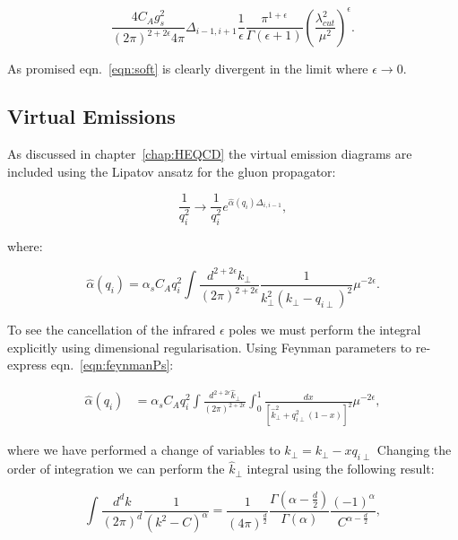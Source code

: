 			\begin{equation}
				\frac{4C_Ag_s^2}{(2\pi)^{2+2\epsilon}4\pi}\Delta_{i-1, i+1}
				\frac{1}{\epsilon}\frac{\pi^{1+\epsilon}}
				{\Gamma(\epsilon+1)}\left(\frac{\lambda_{cut}^2}{\mu^2}\right)^\epsilon.
				\label{eqn:soft}
			\end{equation}

			As promised eqn.~\eqref{eqn:soft} is clearly divergent in the limit where $\epsilon\to0$.

	\subsection{Virtual Emissions}
		\label{sub:subsection_name}

		As discussed in chapter~\ref{chap:HEQCD} the virtual emission diagrams are included
		using the Lipatov ansatz for the gluon propagator:

		\begin{equation}
			\frac{1}{q_i^2}\longrightarrow\frac{1}{q_i^2}e^{\hat{\alpha}(q_i)\Delta_{i,i-1}},
		\end{equation}

		where:

		\begin{equation}
			\hat{\alpha}(q_i) = \alpha_sC_Aq_i^2\int \frac{d^{2+2\epsilon}k_{\perp}}{(2\pi)^{2+2\epsilon}}
			\frac{1}{k^2_\perp(k_\perp - q_{i\perp})^2}\mu^{-2\epsilon}.
			\label{eqn:feynmanPs}
		\end{equation}

		To see the cancellation of the infrared $\epsilon$ poles we must perform the integral
		explicitly using dimensional regularisation. Using Feynman parameters to re-express
		eqn.~\eqref{eqn:feynmanPs}:

		\begin{align}
			\hat{\alpha}(q_i) &= \alpha_sC_Aq_i^2\int \frac{d^{2+2\epsilon}\hat{k}_{\perp}}{(2\pi)^{2+2\epsilon}}\int_0^1
				\frac{dx}{[\hat{k}^2 _\perp + q_{i\perp}^2(1-x)]^2}\mu^{-2\epsilon},
		\end{align}

		where we have performed a change of variables to $\hat{k}_\perp = k_\perp - xq_{i\perp}$
		Changing the order of integration we can perform the $\hat{k}_\perp$ integral
		using the following result:

		\begin{equation}
			\int \frac{d^dk}{(2\pi)^d}\frac{1}{(k^2 - C)^\alpha} = \frac{1}{(4\pi)^{\frac{d}{2}}}
				\frac{\Gamma(\alpha - \frac{d}{2})}{\Gamma(\alpha)}
				\frac{(-1)^\alpha}{C^{\alpha - \frac{d}{2}}},
		\end{equation}

